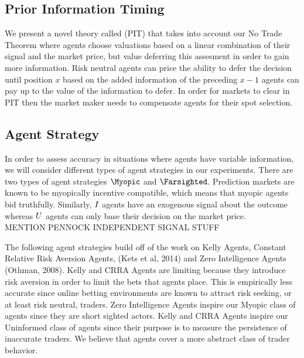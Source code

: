 \subsection{Prior Information Timing}
We present a novel theory called  (PIT) that takes into account our No Trade
Theorem where agents choose valuations based on a linear combination of their signal and the market
price, but value deferring this assesment in order to gain more information. Risk neutral agents can
price the ability to defer the decision until position $x$ based on the added information of the 
preceding $x-1$ agents can pay up to the value of the information to defer. In order for markets
to clear in PIT then the market maker needs to compensate agents for their spot selection.\\

\subsection{Agent Strategy}
In order to assess accuracy in situations where agents have variable information, we will consider different types of agent strategies in our experiments. There are two types of agent strategies  $\Myopic$ and  $\Farsighted$. Prediction markets are known to be myopically incentive compatible, which means that myopic agents bid truthfully. Similarly,  $I$ agents have an exogenous signal about the outcome whereas  $U$ agents can only base their decision on the market price. \\

MENTION PENNOCK INDEPENDENT SIGNAL STUFF

The following agent strategies build off of the work on Kelly Agents, Constant Relative Risk Aversion Agents, (Kets et al, 2014) and Zero Intelligence Agents (Othman, 2008). Kelly and CRRA Agents are limiting because they introduce risk aversion in order to limit the bets that agents place. This is empirically less accurate since online betting environments are known to attract risk seeking, or at least risk neutral, traders. Zero Intelligence Agents inspire our Myopic class of agents since they are short sighted actors. Kelly and CRRA Agents inspire our Uninformed class of agents since their purpose is to measure the persistence of inaccurate traders. We believe that  agents cover a more abstract class of trader behavior.\\

